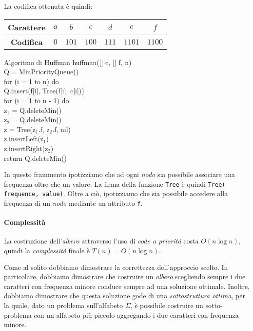 \noindent
La codifica ottenuta è quindi:
\begin{table}[h!]
    \centering
    \renewcommand{\arraystretch}{1.2}
    \begin{tabular}{|c|c|c|c|c|c|c|}
        \hline
        \textbf{Carattere} & $a$ & $b$ & $c$ & $d$ & $e$ & $f$\\
        \hline
        \textbf{Codifica} & $0$ & $101$ & $100$ & $111$ & $1101$ &  $1100$\\
        \hline
    \end{tabular}
\end{table}

\newpage
\begin{minicode}{Algoritmo di Huffman}
\ind{} huffman([] c, [] f,  n)\\
     Q = MinPriorityQueue()\\
    \indf for (i = 1 to n) do\\
        Q.insert(f[i], Tree(f[i], c[i]))\\
    \indf for (i = 1 to n - 1) do\\
        z$_1$ = Q.deleteMin()\\
        z$_2$ = Q.deleteMin()\\
        z = Tree(z$_1$.f, z$_2$.f, nil)\\
        z.insertLeft(z$_1$)\\
        z.insertRight(z$_2$)\\
    \indf return Q.deleteMin()
\end{minicode}
\begin{note}
    In questo frammento ipotizziamo che ad ogni \emph{nodo} sia possibile
    associare una frequenza oltre che un valore. La firma della funzione
    \texttt{Tree} è quindi \texttt{Tree( frequence,  value)}.
    Oltre a ciò, ipotizziamo che sia possibile accedere alla frequenza di un
    \emph{nodo} mediante un attributo \texttt{f}.
\end{note}

\paragraph{Complessità}
La costruzione dell'\emph{albero} attraverso l'uso di \emph{code a priorità}
costa $O(n\log n)$, quindi la \emph{complessità} finale è $T(n)=O(n\log n)$.

\bigskip\noindent
Come al solito dobbiamo dimostrare la correttezza dell'approccio scelto. In
particolare, dobbiamo dimostrare che costruire un \emph{albero} scegliendo
sempre i due caratteri con frequenza minore conduce sempre ad una soluzione
ottimale. Inoltre, dobbiamo dimostrare che questa soluzione gode di una
\emph{sottostruttura ottima}, per la quale, dato un problema sull'alfabeto
$\Sigma$, è possibile costruire un sotto-problema con un alfabeto più piccolo
aggregando i due caratteri con frequenza minore.


